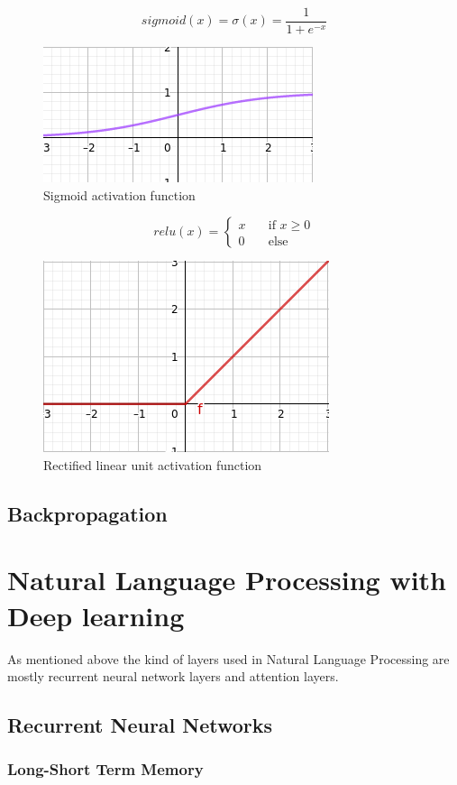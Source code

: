 \[sigmoid(x) = \sigma(x) = \frac{1}{1 + e^{-x}}\]
\begin{figure}[!htb]
	\centering
	\includegraphics[scale=0.5]{sigmoid.jpg}
	\caption{Sigmoid activation function}
	\label{fig:sigmoid}
\end{figure}
\[relu(x) = \begin{cases}x & \quad \text{if } x \geq 0 \\ 0 & \quad \text{else}\end{cases}\]
\begin{figure}[!htb]
	\centering
	\includegraphics[scale=0.5]{relu.jpg}
	\caption{Rectified linear unit activation function}
	\label{fig:relu}
\end{figure}
\subsection{Backpropagation}

\section{Natural Language Processing with Deep learning}
As mentioned above the kind of layers used in Natural Language Processing are mostly recurrent neural network layers and attention layers.
\subsection{Recurrent Neural Networks}
\subsubsection{Long-Short Term Memory}

